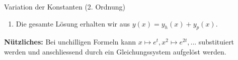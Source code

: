 \begin{Rezept}{Variation der Konstanten (2. Ordnung)}{}
\begin{enumerate}
\begin{enumerate}[(a)]
			\item Inversion der Matrix \begin{equation*}
			\vekk{C_1'(x)}{C_2'(x)} = \frac{1}{y_1(x)y_2'(x)-y_2(x)y_1'(x)} \begin{pmatrix}
			y_2'(x) & -y_2(x)\\-y_1'(x) &y_1(x)
			\end{pmatrix}\cdot\vekk{0}{g(x)}
			\end{equation*}
			und anschliessender Integration $C_1 = \int C_1'(x) dx$, $C_2 = \int C_2'(x) dx$ 
			\item oder mit der direkten Formel
			\begin{equation*}
			y_p(x) = -y_1(x) \int \frac{y_2(x) g(x)}{y_1(x)y_2'(x)-y_2(x)y_1'(x)} dx + y_2(x) \int \frac{y_1(x) g(x)}{y_1(x)y_2'(x)-y_2(x)y_1'(x)}dx.
			\end{equation*}
		\end{enumerate}
		\item Die gesamte Lösung erhalten wir aus $y(x) = y_h(x) + y_p(x)$.
	\end{enumerate}
	
	\textbf{Nützliches:} Bei unchilligen Formeln kann $x\mapsto e^t, x^2\mapsto e^{2t},...$ substituiert werden und anschliessend durch ein Gleichungssystem aufgelöst werden.
\end{Rezept}


